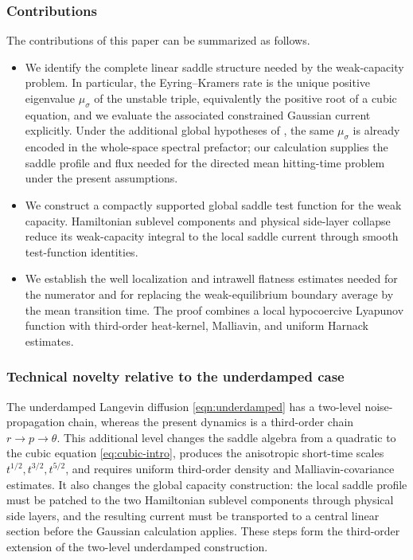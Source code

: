 \documentclass[11pt]{article}
\numberwithin{equation}{section}
\theoremstyle{plain}
\theoremstyle{definition}
\theoremstyle{remark}
\begin{document}
\subsubsection*{Contributions}

The contributions of this paper can be summarized as follows.

\begin{itemize}
    \item We identify the complete linear saddle structure needed by the
    weak-capacity problem.  In particular, the Eyring--Kramers rate is the
    unique positive eigenvalue $\mu_\sigma$ of the unstable triple,
    equivalently the positive root of a cubic equation, and we evaluate the
    associated constrained Gaussian current explicitly.  Under the additional
    global hypotheses of \cite{BonyLePeutrecMichel2025}, the same
    $\mu_\sigma$ is already encoded in the whole-space spectral prefactor;
    our calculation supplies the saddle profile and flux needed for the
    directed mean hitting-time problem under the present assumptions.
    \item We construct a compactly supported global saddle test function for
    the weak capacity.  Hamiltonian sublevel components and physical
    side-layer collapse reduce its weak-capacity integral to the local saddle
    current through smooth test-function identities.
    \item We establish the well localization and intrawell flatness estimates
    needed for the numerator and for replacing the weak-equilibrium boundary
    average by the mean transition time.  The proof combines a local
    hypocoercive Lyapunov function with third-order heat-kernel, Malliavin, and
    uniform Harnack estimates.
\end{itemize}

\subsubsection*{Technical novelty relative to the underdamped case}
The underdamped Langevin diffusion \eqref{eqn:underdamped} has a two-level noise-propagation chain, whereas the
present dynamics is a third-order chain $r\to p\to\theta$.  This additional
level changes the saddle algebra from a quadratic to the cubic equation
\eqref{eq:cubic-intro}, produces the anisotropic short-time scales
$t^{1/2},t^{3/2},t^{5/2}$, and requires uniform third-order density and
Malliavin-covariance estimates.  It also changes the global capacity
construction: the local saddle profile must be patched to the two Hamiltonian
sublevel components through physical side layers, and the resulting current
must be transported to a central linear section before the Gaussian
calculation applies.  These steps form the third-order extension of the
two-level underdamped construction.
\end{document}
